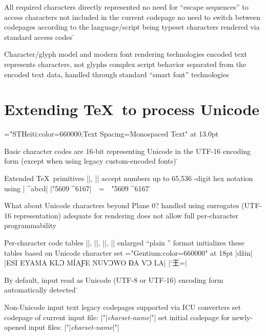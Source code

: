 \item All required characters directly represented
\subitem no need for “escape sequences” to access characters not included in the current codepage
\subitem no need to switch between codepages according to the language/script being typeset 
\subitem characters rendered via standard access codes
\=
\item Character/glyph model and modern font rendering technologies
\subitem encoded text represents characters, not glyphs
\subitem complex script behavior separated from the encoded text data,
handled through standard “smart font” technologies

\section{Extending \TeX\ to process Unicode}

\font\simpchin="STHeiti:color=660000;Text Spacing=Monospaced Text" at 13.0pt
\item Basic character codes are 16-bit
\subitem representing Unicode in the UTF-16 encoding form
\subitem (except when using legacy custom-encoded fonts)
\=
\item Extended \TeX\ primitives
\subitem |\char|, |\chardef| accept numbers up to 65,536
-digit hex notation using |^^^^abcd|\hfil\break\indent
 |\char"5609^^^^6167|\ \ =\ \ {\simpchin \char"5609^^^^6167}
\=
\item What about Unicode characters beyond Plane 0?
\subitem handled using surrogates (UTF-16 representation)
\subitem adequate for rendering
\subitem does not allow full per-character programmability

\item Per-character code tables |\catcode|, |\lccode|, |\uccode|, |\sfcode| enlarged
\subitem “plain \XeTeX” format initializes these tables based on Unicode character set
\font\smp="Gentium:color=660000" at 18pt
\subitem |\lowercase{DŽIN}|\hfil\break{}
\subitem |\uppercase{Esi eyama klɔ míaƒe nuvɔwo ɖa vɔ la}|\hfil\break{}
\subitem |\catcode`王=\active {}|

\item By default, input read as Unicode (UTF-8 or UTF-16)
\subitem encoding form automatically detected
\=
\item Non-Unicode input text
\subitem legacy codepages supported via ICU converters
\subitem set codepage of current input file:\hfil\break
|\XeTeXinputencoding "|{\it charset-name}|"|
\subitem set initial codepage for newly-opened input files:\hfil\break
|\XeTeXdefaultencoding "|{\it charset-name}|"|

